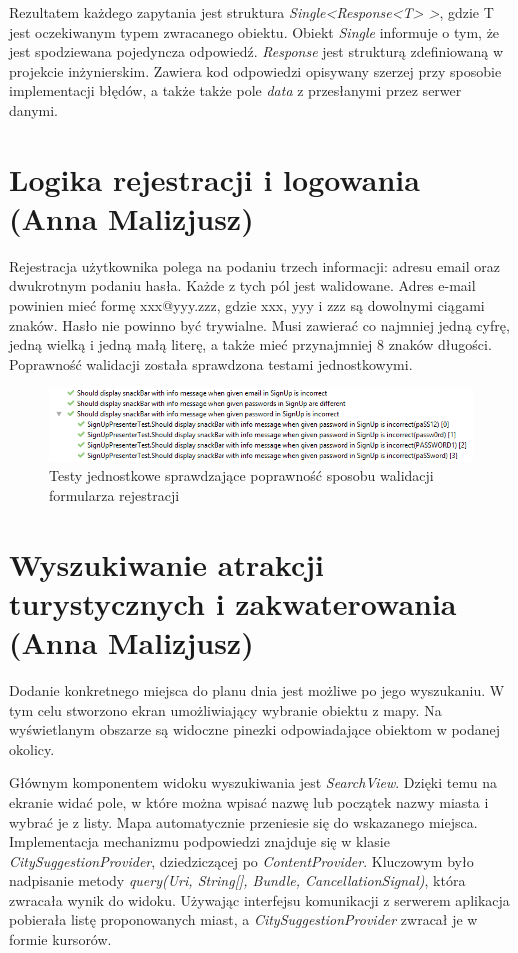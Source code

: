 \documentclass[10pt,twoside,a4paper]{report}
\begin{document}
\par Rezultatem każdego zapytania jest struktura \textit{Single<Response<T> >}, gdzie T jest oczekiwanym typem zwracanego obiektu. Obiekt \textit{Single} informuje o tym, że jest spodziewana pojedyncza odpowiedź. \textit{Response} jest strukturą zdefiniowaną w projekcie inżynierskim. Zawiera kod odpowiedzi opisywany szerzej przy sposobie implementacji błędów, a także także pole \textit{data} z przesłanymi przez serwer danymi.


\section{Logika rejestracji i logowania (Anna Malizjusz)}
\par Rejestracja użytkownika polega na podaniu trzech informacji: adresu email oraz dwukrotnym podaniu hasła. Każde z tych pól jest walidowane. Adres e-mail powinien mieć formę xxx@yyy.zzz, gdzie xxx, yyy i zzz są dowolnymi ciągami znaków. Hasło nie powinno być trywialne. Musi zawierać co najmniej jedną cyfrę, jedną wielką i jedną małą literę, a także mieć przynajmniej 8 znaków długości. Poprawność walidacji została sprawdzona testami jednostkowymi.

\begin{figure}[h]
\centering
\includegraphics[width=\linewidth]{registerUnitTestResult}
\caption{Testy jednostkowe sprawdzające poprawność sposobu walidacji formularza rejestracji}
\label{fig:tokenPayload}
\end{figure}


\section{Wyszukiwanie atrakcji turystycznych i zakwaterowania (Anna Malizjusz)}
\par Dodanie konkretnego miejsca do planu dnia jest możliwe po jego wyszukaniu. W tym celu stworzono ekran umożliwiający wybranie obiektu z mapy. Na wyświetlanym obszarze są widoczne pinezki odpowiadające obiektom w podanej okolicy.

\par Głównym komponentem widoku wyszukiwania jest \textit{SearchView}\cite{SearchView}. Dzięki temu na ekranie widać pole, w które można wpisać nazwę lub początek nazwy miasta i wybrać je z listy. Mapa automatycznie przeniesie się do wskazanego miejsca. Implementacja mechanizmu podpowiedzi znajduje się w klasie \textit{CitySuggestionProvider}, dziedziczącej po \textit{ContentProvider}\cite{ContentProvider}. Kluczowym było nadpisanie metody \textit{query(Uri, String[], Bundle, CancellationSignal)}, która zwracała wynik do widoku. Używając interfejsu komunikacji z serwerem aplikacja pobierała listę proponowanych miast, a \textit{CitySuggestionProvider} zwracał je w formie kursorów.
\end{document}
